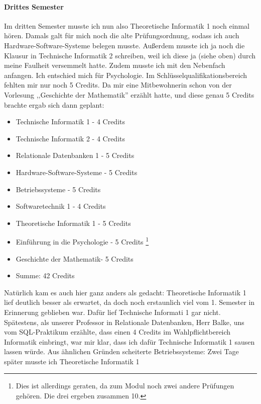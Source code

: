 \paragraph*{Drittes Semester}
Im dritten Semester musste ich nun also Theoretische Informatik 1 noch
einmal hören. Damals galt für mich noch die alte
Prüfungsordnung, sodass ich auch  Hardware-Software-Systeme
belegen musste. Außerdem musste ich ja noch die Klausur in Technische
Informatik 2 schreiben, weil ich diese ja (siehe oben) durch meine
Faulheit versemmelt hatte. Zudem musste ich mit den Nebenfach
anfangen. Ich entschied mich für Psychologie. Im
Schlüsselqualifikationsbereich fehlten mir nur noch 5 Credits. Da mir
eine Mitbewohnerin 
schon von der Vorlesung ,,Geschichte der Mathematik''  erzählt hatte,
und diese genau 5 Credits brachte ergab sich dann geplant:
\begin{itemize}
\item Technische Informatik 1 - 4 Credits
\item Technische Informatik 2 - 4 Credits
\item Relationale Datenbanken 1 - 5 Credits 
\item Hardware-Software-Systeme - 5 Credits
\item Betriebssysteme - 5 Credits
\item Softwaretechnik 1 - 4 Credits
\item Theoretische Informatik 1 - 5 Credits
\item Einführung in die Psychologie - 5 Credits \footnote{Dies ist
    allerdings geraten, da zum Modul noch zwei andere Prüfungen
    gehören. Die drei ergeben zusammen 10.}
\item Geschichte der Mathematik- 5 Credits
\item Summe: 42 Credits
\end{itemize}
Natürlich kam es auch hier ganz anders als gedacht: Theoretische
Informatik 1 lief deutlich besser als erwartet, da doch noch
erstaunlich viel vom 1. Semester in Erinnerung geblieben war. Dafür
lief Technische Informati 1 gar nicht. Spätestens, als unserer
Professor in Relationale Datenbanken, Herr Balke, uns vom
SQL-Praktikum erzählte, dass einen 4 Credits im Wahlpflichtbereich
Informatik einbringt, war mir klar, dass ich dafür Technische
Informatik 1 sausen lassen würde. Aus ähnlichen Gründen scheiterte
Betriebssysteme: Zwei Tage später musste ich Theoretische Informatik 1

